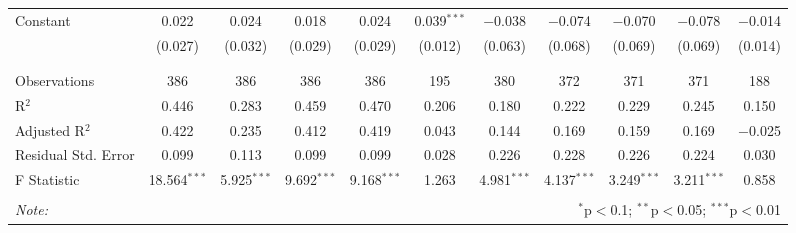 \begin{table}[H]
\begin{tabular}{@{\extracolsep{4pt}}lcccccccccc}
 Constant & 0.022 & 0.024 & 0.018 & 0.024 & 0.039$^{***}$ & $-$0.038 & $-$0.074 & $-$0.070 & $-$0.078 & $-$0.014 \\ 
  & (0.027) & (0.032) & (0.029) & (0.029) & (0.012) & (0.063) & (0.068) & (0.069) & (0.069) & (0.014) \\ 
  & & & & & & & & & & \\ 
\hline \\[-1.8ex] 
Observations & 386 & 386 & 386 & 386 & 195 & 380 & 372 & 371 & 371 & 188 \\ 
R$^{2}$ & 0.446 & 0.283 & 0.459 & 0.470 & 0.206 & 0.180 & 0.222 & 0.229 & 0.245 & 0.150 \\ 
Adjusted R$^{2}$ & 0.422 & 0.235 & 0.412 & 0.419 & 0.043 & 0.144 & 0.169 & 0.159 & 0.169 & $-$0.025 \\ 
Residual Std. Error & 0.099 & 0.113 & 0.099 & 0.099 & 0.028 & 0.226 & 0.228 & 0.226 & 0.224 & 0.030 \\ 
F Statistic & 18.564$^{***}$ & 5.925$^{***}$ & 9.692$^{***}$ & 9.168$^{***}$ & 1.263 & 4.981$^{***}$ & 4.137$^{***}$ & 3.249$^{***}$ & 3.211$^{***}$ & 0.858 \\ 
\hline 
\hline \\[-1.8ex] 
\textit{Note:}  & \multicolumn{10}{r}{$^{*}$p$<$0.1; $^{**}$p$<$0.05; $^{***}$p$<$0.01} \\ 
\end{tabular} 
\end{table} 
